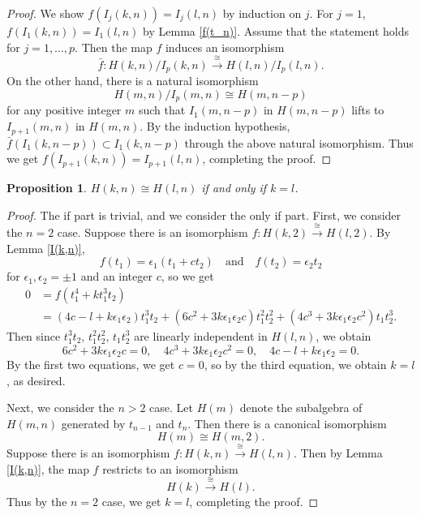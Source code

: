 \documentclass[a4paper]{amsart}
\numberwithin{equation}{section}
\newtheorem{proposition}[theorem]{Proposition}
\theoremstyle{definition}
\theoremstyle{remark}
\numberwithin{equation}{section}
\begin{document}
\begin{proof}
  We show $f(I_j(k,n))=I_j(l,n)$ by induction on $j$. For $j=1$, $f(I_1(k,n))=I_1(l,n)$ by Lemma \ref{f(t_n)}. Assume that the statement holds for $j=1,\ldots,p$. Then the map $f$ induces an isomorphism
  \[
    \bar{f}\colon H(k,n)/I_p(k,n)\xrightarrow{\cong}H(l,n)/I_p(l,n).
  \]
  On the other hand, there is a natural isomorphism
  \[
    H(m,n)/I_p(m,n)\cong H(m,n-p)
  \]
  for any positive integer $m$ such that $I_1(m,n-p)$ in $H(m,n-p)$ lifts to $I_{p+1}(m,n)$ in $H(m,n)$. By the induction hypothesis, $\bar{f}(I_1(k,n-p))\subset I_1(k,n-p)$ through the above natural isomorphism. Thus we get $f(I_{p+1}(k,n))=I_{p+1}(l,n)$, completing the proof.
\end{proof}



\begin{proposition}
  \label{H(k,n)}
  $H(k,n)\cong H(l,n)$ if and only if $k=l$.
\end{proposition}

\begin{proof}
  The if part is trivial, and we consider the only if part. First, we consider the $n=2$ case. Suppose there is an isomorphism $f\colon H(k,2)\xrightarrow{\cong}H(l,2)$. By Lemma \ref{I(k,n)},
  \[
    f(t_1)=\epsilon_1(t_1+ct_2)\quad\text{and}\quad f(t_2)=\epsilon_2t_2
  \]
  for $\epsilon_1,\epsilon_2=\pm 1$ and an integer $c$, so we get
  \begin{align*}
    0&=f(t_1^4+kt_1^3t_2)\\
    &=(4c-l+k\epsilon_1\epsilon_2)t_1^3t_2+(6c^2+3k\epsilon_1\epsilon_2c)t_1^2t_2^2+(4c^3+3k\epsilon_1\epsilon_2c^2)t_1t_2^3.
  \end{align*}
  Then since $t_1^3t_2,\,t_1^2t_2^2,\,t_1t_2^3$ are linearly independent in $H(l,n)$, we obtain
  \[
    6c^2+3k\epsilon_1\epsilon_2c=0,\quad 4c^3+3k\epsilon_1\epsilon_2c^2=0,\quad 4c-l+k\epsilon_1\epsilon_2=0.
  \]
  By the first two equations, we get $c=0$, so by the third equation, we obtain $k=l$, as desired.



  Next, we consider the $n>2$ case. Let $H(m)$ denote the subalgebra of $H(m,n)$ generated by $t_{n-1}$ and $t_n$. Then there is a canonical isomorphism
  \[
    H(m)\cong H(m,2).
  \]
  Suppose there is an isomorphism $f\colon H(k,n)\xrightarrow{\cong}H(l,n)$. Then by Lemma \ref{I(k,n)}, the map $f$ restricts to an isomorphism
  \[
    H(k)\xrightarrow{\cong}H(l).
  \]
  Thus by the $n=2$ case, we get $k=l$, completing the proof.
\end{proof}
\end{document}

